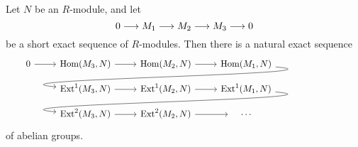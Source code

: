 
\begin{theorem}\label{thm:long-exact-sequence-of-Ext}
Let $N$ be an $R$-module, and let
\[
	0 \longrightarrow M_1 \longrightarrow M_2 \longrightarrow M_3 \longrightarrow 0
\]
be a short exact sequence of $R$-modules. Then there is a natural exact sequence
\[
\mkern-72mu\begin{tikzcd}[row sep=small]
	0 \arrow{r}
		& \Hom(M_3,N) \arrow{r}
		& \Hom(M_2,N) \arrow{r} 
		& \Hom(M_1,N)  \arrow[out=-5, in=175]{dll} \\
	& \Ext^1(M_3,N) \arrow{r}
		& \Ext^1(M_2,N) \arrow{r} 
		& \Ext^1(M_1,N)  \arrow[out=-5, in=175]{dll} \\
	& \Ext^2(M_3,N) \arrow{r}
		& \Ext^2(M_2,N) \arrow{r} 
		& \quad\cdots\quad
\end{tikzcd} 
\]
of abelian groups.
\end{theorem}


